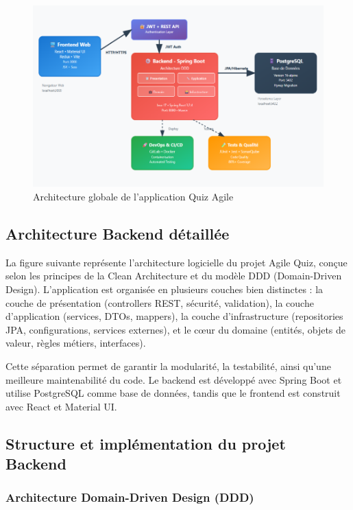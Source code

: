 \documentclass[12pt,a4paper]{report}
\begin{document}
\begin{figure}[H]
\centering
\includegraphics[width=1.0\textwidth]{latex_media/media/Architecture_globale.png}
\caption{Architecture globale de l'application Quiz Agile}
\label{fig:architecture-globale}
\end{figure}

\subsection{Architecture Backend détaillée}

La figure suivante représente l'architecture logicielle du projet Agile Quiz, conçue selon les principes de la Clean Architecture et du modèle DDD (Domain-Driven Design). L'application est organisée en plusieurs couches bien distinctes : la couche de présentation (controllers REST, sécurité, validation), la couche d'application (services, DTOs, mappers), la couche d'infrastructure (repositories JPA, configurations, services externes), et le cœur du domaine (entités, objets de valeur, règles métiers, interfaces).

Cette séparation permet de garantir la modularité, la testabilité, ainsi qu'une meilleure maintenabilité du code. Le backend est développé avec Spring Boot et utilise PostgreSQL comme base de données, tandis que le frontend est construit avec React et Material UI.

\subsection{Structure et implémentation du projet Backend}

\subsubsection{Architecture Domain-Driven Design (DDD)}
\end{document}
